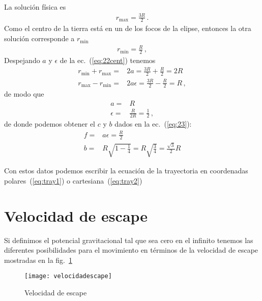 \begin{itemize}
\begin{align}
\end{align}
La solución física es
\begin{align}
  r_{\text{max}}=\frac{3R}{2}\,.
\end{align}
Como el centro de la tierra está en un de los focos de la elipse, entonces la otra solución corresponde a $r_{\text{min}}$
\begin{align}
  r_{\text{min}}=\frac{R}{2}\,,
\end{align}
Despejando $a$ y $\epsilon$ de la ec.~(\ref{eq:22cent}) tenemos
\begin{align}
  r_{\text{min}}+r_{\text{max}}=&2a=\frac{3R}{2}+\frac{R}{2}=2R\nonumber\\
  r_{\text{max}}-r_{\text{min}}=&2a\epsilon=\frac{3R}{2}-\frac{R}{2}=R\,,
\end{align}
de modo que
\begin{align}
  a=&R\nonumber\\
  \epsilon=&\frac{R}{2R}=\frac{1}{2}\,,
\end{align}
de donde podemos obtener el $c$ y $b$ dados en la ec.~(\ref{eq:23}):
\begin{align*}
  f=&a\epsilon=\frac{R}{2}\nonumber\\
  b=&R\sqrt{1-\frac{1}{4}}=R\sqrt{\frac{3}{4}}=\frac{\sqrt{3}}{2}R
\end{align*}

Con estos datos podemos escribir la ecuación de la trayectoria en coordenadas polares~(\ref{eq:tray1}) o cartesiana~(\ref{eq:tray2})

\end{itemize}



\section{Velocidad de escape}

Si definimos el potencial gravitacional tal que sea cero en el infinito tenemos las diferentes posibilidades para el movimiento en términos de la velocidad de escape mostradas en la fig.~\ref{fig:velocidadescape}

\begin{frame}
\begin{figure}
  \centering
  \texttt{[image: velocidadescape]}
  \caption{Velocidad de escape}
  \label{fig:velocidadescape}
\end{figure}
\end{frame}

